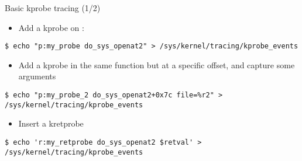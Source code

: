 \begin{frame}[fragile]{Basic kprobe tracing (1/2)}
	\begin{itemize}
		\item Add a kprobe on :
	\end{itemize}
	\begin{block}{}
		\begin{verbatim}
$ echo "p:my_probe do_sys_openat2" > /sys/kernel/tracing/kprobe_events
		\end{verbatim}
	\end{block}
	\begin{itemize}
		\item Add a kprobe in the same function but at a specific
			offset, and capture some arguments
	\end{itemize}
	\begin{block}{}
		\begin{verbatim}
$ echo "p:my_probe_2 do_sys_openat2+0x7c file=%r2" > /sys/kernel/tracing/kprobe_events
		\end{verbatim}
	\end{block}
	\begin{itemize}
		\item Insert a kretprobe
	\end{itemize}
	\begin{block}{}
		\begin{verbatim}
$ echo 'r:my_retprobe do_sys_openat2 $retval' > /sys/kernel/tracing/kprobe_events
		\end{verbatim}
	\end{block}
\end{frame}

